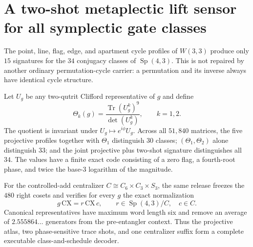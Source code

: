 \section*{A two-shot metaplectic lift sensor for all symplectic gate classes}
The point, line, flag, edge, and apartment cycle profiles of $W(3,3)$ produce only
$15$ signatures for the $34$ conjugacy classes of $\operatorname{Sp}(4,3)$. This is
not repaired by another ordinary permutation-cycle carrier: a permutation and its inverse
always have identical cycle structure.

Let $U_g$ be any two-qutrit Clifford representative of $g$ and define
\[
 \Theta_k(g)=\frac{\operatorname{Tr}(U_g^k)^9}{\det(U_g^k)},\qquad k=1,2.
\]
The quotient is invariant under $U_g\mapsto e^{i\phi}U_g$. Across all $51{,}840$
matrices, the five projective profiles together with $\Theta_1$ distinguish $30$ classes;
$(\Theta_1,\Theta_2)$ alone distinguish $33$; and the joint projective plus two-shot
signature distinguishes all $34$. The values have a finite exact code consisting of a
zero flag, a fourth-root phase, and twice the base-$3$ logarithm of the magnitude.

For the controlled-add centralizer $C\cong C_6\times C_3\times S_3$, the same release
freezes the $480$ right cosets and verifies for every $g$ the exact normalization
\[
 g\,\mathrm{CX}=r\,\mathrm{CX}\,c,\qquad r\in\operatorname{Sp}(4,3)/C,
 \quad c\in C.
\]
Canonical representatives have maximum word length six and remove an average of
$2.555864\ldots$ generators from the pre-entangler context. Thus the projective atlas,
two phase-sensitive trace shots, and one centralizer suffix form a complete executable
class-and-schedule decoder.
